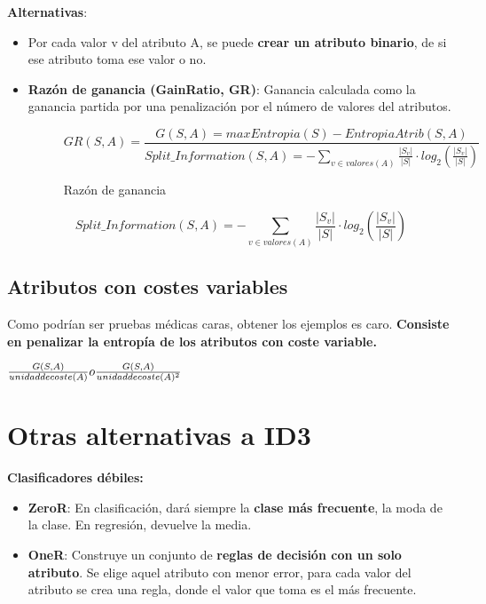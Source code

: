 \documentclass[12pt, twoside, openright]{report} %
\begin{document}
\textbf{Alternativas}:

\begin{itemize}
	\item Por cada valor v del atributo A, se puede \textbf{crear un atributo binario}, de si ese atributo toma ese valor o no.
	      \pagebreak
	\item \textbf{Razón de ganancia (GainRatio, GR)}: Ganancia calculada como la ganancia partida por una penalización por el número de valores del
	      atributos.
	      \begin{figure}[H]
		      $$
			      GR(S, A)= \frac {G(S, A)=max Entropia(S)-EntropiaAtrib(S, A)}{\textit{Split\_Information}(S, A)=-\sum_{v\in valores(A)} \frac {|S_v|}{|S|} \cdot log_2(\frac {|S_v|}{|S|})}
		      $$
		      \captionsetup{justification=centering}
		      \caption{Razón de ganancia}
	      \end{figure}
	      $$
		      \textit{Split\_Information}(S, A)=-\sum_{v\in valores(A)} \frac {|S_v|}{|S|} \cdot log_2(\frac {|S_v|}{|S|})
	      $$
\end{itemize}

\subsection{Atributos con costes
	variables}

Como podrían ser pruebas médicas caras, obtener los ejemplos es caro.
\textbf{Consiste en penalizar la entropía de los atributos con coste
	variable.}

\(\frac {G(S, A)}{unidad \space de \space coste(A)} o \frac {G(S, A)}{unidad \space de \space coste(A)^2}\)

\section{Otras alternativas a ID3}

\textbf{Clasificadores débiles:}

\begin{itemize}
	\item \textbf{ZeroR}: En clasificación, dará siempre la \textbf{clase más
		      frecuente}, la moda de la clase. En regresión, devuelve la media.
	\item \textbf{OneR}: Construye un conjunto de \textbf{reglas de decisión con
		      un solo atributo}. Se elige aquel atributo con menor error, para cada
	      valor del atributo se crea una regla, donde el valor que toma es el
	      más frecuente.
\end{itemize}
\end{document}
